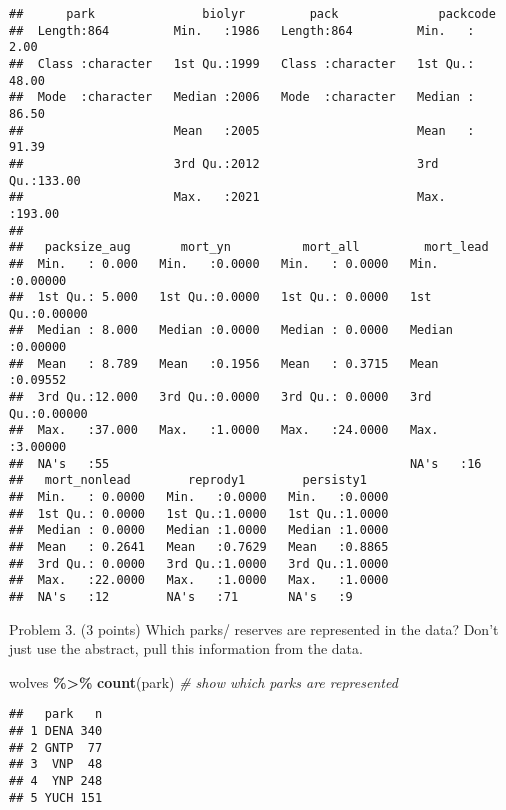 \documentclass[
]{article}
\newenvironment{Shaded}{\begin{snugshade}}{\end{snugshade}}
\newcommand{\CommentTok}[1]{\textcolor[rgb]{0.56,0.35,0.01}{\textit{#1}}}
\newcommand{\FunctionTok}[1]{\textcolor[rgb]{0.13,0.29,0.53}{\textbf{#1}}}
\newcommand{\NormalTok}[1]{#1}
\newcommand{\SpecialCharTok}[1]{\textcolor[rgb]{0.81,0.36,0.00}{\textbf{#1}}}
\begin{document}
\begin{verbatim}
##      park               biolyr         pack              packcode     
##  Length:864         Min.   :1986   Length:864         Min.   :  2.00  
##  Class :character   1st Qu.:1999   Class :character   1st Qu.: 48.00  
##  Mode  :character   Median :2006   Mode  :character   Median : 86.50  
##                     Mean   :2005                      Mean   : 91.39  
##                     3rd Qu.:2012                      3rd Qu.:133.00  
##                     Max.   :2021                      Max.   :193.00  
##                                                                       
##   packsize_aug       mort_yn          mort_all         mort_lead      
##  Min.   : 0.000   Min.   :0.0000   Min.   : 0.0000   Min.   :0.00000  
##  1st Qu.: 5.000   1st Qu.:0.0000   1st Qu.: 0.0000   1st Qu.:0.00000  
##  Median : 8.000   Median :0.0000   Median : 0.0000   Median :0.00000  
##  Mean   : 8.789   Mean   :0.1956   Mean   : 0.3715   Mean   :0.09552  
##  3rd Qu.:12.000   3rd Qu.:0.0000   3rd Qu.: 0.0000   3rd Qu.:0.00000  
##  Max.   :37.000   Max.   :1.0000   Max.   :24.0000   Max.   :3.00000  
##  NA's   :55                                          NA's   :16       
##   mort_nonlead        reprody1        persisty1     
##  Min.   : 0.0000   Min.   :0.0000   Min.   :0.0000  
##  1st Qu.: 0.0000   1st Qu.:1.0000   1st Qu.:1.0000  
##  Median : 0.0000   Median :1.0000   Median :1.0000  
##  Mean   : 0.2641   Mean   :0.7629   Mean   :0.8865  
##  3rd Qu.: 0.0000   3rd Qu.:1.0000   3rd Qu.:1.0000  
##  Max.   :22.0000   Max.   :1.0000   Max.   :1.0000  
##  NA's   :12        NA's   :71       NA's   :9
\end{verbatim}

Problem 3. (3 points) Which parks/ reserves are represented in the data?
Don't just use the abstract, pull this information from the data.

\begin{Shaded}
\begin{Highlighting}[]
\NormalTok{wolves }\SpecialCharTok{\%\textgreater{}\%}
  \FunctionTok{count}\NormalTok{(park) }\CommentTok{\# show which parks are represented}
\end{Highlighting}
\end{Shaded}

\begin{verbatim}
##   park   n
## 1 DENA 340
## 2 GNTP  77
## 3  VNP  48
## 4  YNP 248
## 5 YUCH 151
\end{verbatim}
\end{document}
